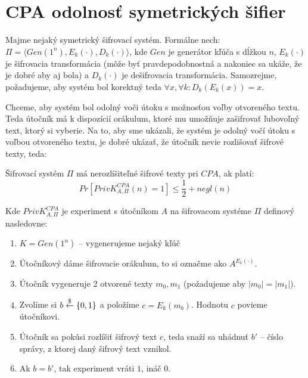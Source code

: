 \section{CPA odolnosť symetrických šifier}

Majme nejaký symetrický šifrovací systém. Formálne nech:
$\Pi = \langle Gen(1^n), E_k(\cdot), D_k(\cdot) \rangle$, 
kde $Gen$ je generátor kľúča s dĺžkou $n$, 
$E_k(\cdot)$ je šifrovacia transformácia (môže byť
pravdepodobnostná a nakoniec sa ukáže, že je dobré aby aj bola)
a $D_k(\cdot)$ je dešifrovacia transformácia. Samozrejme, požadujeme, aby
systém bol korektný teda $\forall x, \forall k\colon D_k(E_k(x))=x$.

Chceme, aby systém bol odolný voči útoku s možnosťou voľby otvoreného textu.
Teda útočník má k dispozícií orákulum, ktoré mu umožňuje zašifrovať ľubovoľný
text, ktorý si vyberie. Na to, aby sme ukázali, že systém je odolný vočí 
útoku s voľbou otvoreného textu, je dobré ukázať, že útočník
nevie rozlišovať šifrové texty, teda:

\begin{definicia}
    Šifrovací systém $\Pi$ má nerozlíšiteľné šifrové texty pri $CPA$, ak platí:
    \begin{equation*}
        Pr[PrivK_{A,\Pi}^{CPA}(n) = 1] \leq \frac{1}{2} + negl(n)
    \end{equation*}

    Kde $PrivK_{A,\Pi}^{CPA}$ je experiment s útočníkom $A$ na
    šifrovacom systéme $\Pi$ definový nasledovne:
    \begin{enumerate}
        \item $K = Gen(1^n)$ -- vygenerujeme nejaký kľúč
        \item Útočníkový dáme šifrovacie orákulum,
            to si označme ako $A^{E_k(\cdot)}$. 
            
        \item Útočník vygeneruje 2 otvorené texty $m_0,m_1$ 
            (požadujeme aby $|m_0| = |m_1|$). 
        \item Zvolíme si $b \overset{\$}{\leftarrow} \{0,1\}$ a položíme $c = E_k(m_b)$.
            Hodnotu $c$ povieme útočníkovi.
        \item Útočník sa pokúsi rozlíšiť šifrový text $c$, teda snaží
            sa uhádnuť $b'$ -- číslo správy, z ktorej daný šifrový
            text vznikol.
        \item Ak $b=b{'}$, tak experiment vráti $1$, ináč $0$.
    \end{enumerate}
\end{definicia}

